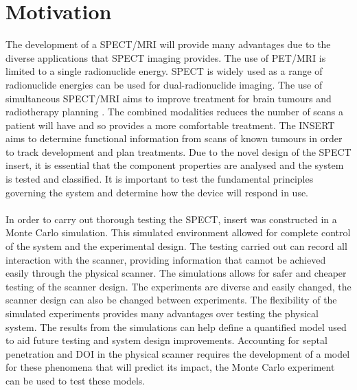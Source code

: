\section{Motivation}
The development of a SPECT/MRI will provide many advantages due to the diverse applications that SPECT imaging provides. The use of PET/MRI is limited to a single radionuclide energy. SPECT is widely used as a range of radionuclide energies can be used for dual-radionuclide imaging. The use of simultaneous SPECT/MRI aims to improve treatment for brain tumours and radiotherapy planning \cite{doi:10.1259/bjr.20160690}. The combined modalities reduces the number of scans a patient will have and so provides a more comfortable treatment. The INSERT aims to determine functional information from scans of known tumours in order to track development and plan treatments. Due to the novel design of the SPECT insert, it is essential that the component properties are analysed and the system is tested and classified. It is important to test the fundamental principles governing the system and determine how the device will respond in use.
\paragraph{}
In order to carry out thorough testing the SPECT, insert was constructed in a Monte Carlo simulation. This simulated environment allowed for complete control of the system and the experimental design. The testing carried out can record all interaction with the scanner, providing information that cannot be achieved easily through the physical scanner. The simulations allows for safer and cheaper testing of the scanner design. The experiments are diverse and easily changed, the scanner design can also be changed between experiments. The flexibility of the simulated experiments provides many advantages over testing the physical system. The results from the simulations can help define a quantified model used to aid future testing and system design improvements. Accounting for septal penetration and DOI in the physical scanner requires the development of a model for these phenomena that will predict its impact, the Monte Carlo experiment can be used to test these models. 
\blindtext
